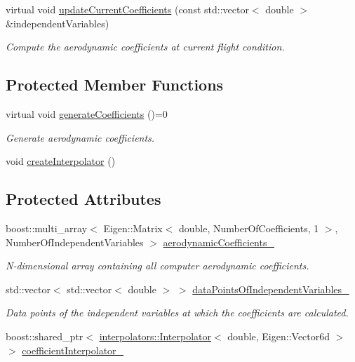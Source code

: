 \begin{DoxyCompactItemize}
virtual void \hyperlink{classtudat_1_1aerodynamics_1_1AerodynamicCoefficientGenerator_a90ff928cb8d868f9b05748e125d871ff}{update\+Current\+Coefficients} (const std\+::vector$<$ double $>$ \&independent\+Variables)
\begin{DoxyCompactList}\small\item\em Compute the aerodynamic coefficients at current flight condition. \end{DoxyCompactList}\end{DoxyCompactItemize}
\subsection*{Protected Member Functions}
\begin{DoxyCompactItemize}
\item 
virtual void \hyperlink{classtudat_1_1aerodynamics_1_1AerodynamicCoefficientGenerator_a33f99bba58afd64d95b5c896b29234fb}{generate\+Coefficients} ()=0
\begin{DoxyCompactList}\small\item\em Generate aerodynamic coefficients. \end{DoxyCompactList}\item 
void \hyperlink{classtudat_1_1aerodynamics_1_1AerodynamicCoefficientGenerator_a8e6f4b78c17854f5cab41f5c404fca00}{create\+Interpolator} ()
\end{DoxyCompactItemize}
\subsection*{Protected Attributes}
\begin{DoxyCompactItemize}
\item 
boost\+::multi\+\_\+array$<$ Eigen\+::\+Matrix$<$ double, Number\+Of\+Coefficients, 1 $>$, Number\+Of\+Independent\+Variables $>$ \hyperlink{classtudat_1_1aerodynamics_1_1AerodynamicCoefficientGenerator_ad6fc1e382d822715b80f9a1636e5ce53}{aerodynamic\+Coefficients\+\_\+}
\begin{DoxyCompactList}\small\item\em N-\/dimensional array containing all computer aerodynamic coefficients. \end{DoxyCompactList}\item 
std\+::vector$<$ std\+::vector$<$ double $>$ $>$ \hyperlink{classtudat_1_1aerodynamics_1_1AerodynamicCoefficientGenerator_a14278ec758b9bfbfa73c5564abce310f}{data\+Points\+Of\+Independent\+Variables\+\_\+}
\begin{DoxyCompactList}\small\item\em Data points of the independent variables at which the coefficients are calculated. \end{DoxyCompactList}\item 
boost\+::shared\+\_\+ptr$<$ \hyperlink{classtudat_1_1interpolators_1_1Interpolator}{interpolators\+::\+Interpolator}$<$ double, Eigen\+::\+Vector6d $>$ $>$ \hyperlink{classtudat_1_1aerodynamics_1_1AerodynamicCoefficientGenerator_aa8717ac85b4f9ff9ee4cccbafaccb8b6}{coefficient\+Interpolator\+\_\+}
\end{DoxyCompactItemize}


